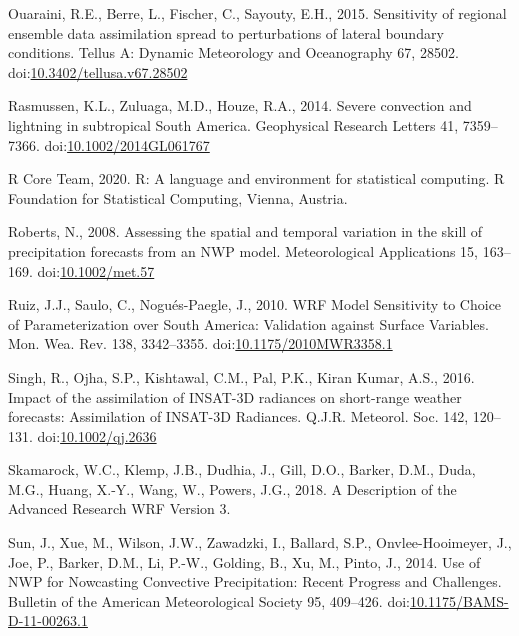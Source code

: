 \documentclass[final,5p,times,twocolumn,authoryear]{elsarticle} %
\begin{document}
\leavevmode\hypertarget{ref-ouaraini2015}{}%
Ouaraini, R.E., Berre, L., Fischer, C., Sayouty, E.H., 2015. Sensitivity of regional ensemble data assimilation spread to perturbations of lateral boundary conditions. Tellus A: Dynamic Meteorology and Oceanography 67, 28502. doi:\href{https://doi.org/10.3402/tellusa.v67.28502}{10.3402/tellusa.v67.28502}

\leavevmode\hypertarget{ref-rasmussen2014}{}%
Rasmussen, K.L., Zuluaga, M.D., Houze, R.A., 2014. Severe convection and lightning in subtropical South America. Geophysical Research Letters 41, 7359--7366. doi:\href{https://doi.org/10.1002/2014GL061767}{10.1002/2014GL061767}

\leavevmode\hypertarget{ref-rcoreteam2020}{}%
R Core Team, 2020. R: A language and environment for statistical computing. R Foundation for Statistical Computing, Vienna, Austria.

\leavevmode\hypertarget{ref-roberts2008}{}%
Roberts, N., 2008. Assessing the spatial and temporal variation in the skill of precipitation forecasts from an NWP model. Meteorological Applications 15, 163--169. doi:\href{https://doi.org/10.1002/met.57}{10.1002/met.57}

\leavevmode\hypertarget{ref-ruiz2010}{}%
Ruiz, J.J., Saulo, C., Nogués-Paegle, J., 2010. WRF Model Sensitivity to Choice of Parameterization over South America: Validation against Surface Variables. Mon. Wea. Rev. 138, 3342--3355. doi:\href{https://doi.org/10.1175/2010MWR3358.1}{10.1175/2010MWR3358.1}

\leavevmode\hypertarget{ref-singh2016}{}%
Singh, R., Ojha, S.P., Kishtawal, C.M., Pal, P.K., Kiran Kumar, A.S., 2016. Impact of the assimilation of INSAT-3D radiances on short-range weather forecasts: Assimilation of INSAT-3D Radiances. Q.J.R. Meteorol. Soc. 142, 120--131. doi:\href{https://doi.org/10.1002/qj.2636}{10.1002/qj.2636}

\leavevmode\hypertarget{ref-skamarock2018}{}%
Skamarock, W.C., Klemp, J.B., Dudhia, J., Gill, D.O., Barker, D.M., Duda, M.G., Huang, X.-Y., Wang, W., Powers, J.G., 2018. A Description of the Advanced Research WRF Version 3.

\leavevmode\hypertarget{ref-sun2014}{}%
Sun, J., Xue, M., Wilson, J.W., Zawadzki, I., Ballard, S.P., Onvlee-Hooimeyer, J., Joe, P., Barker, D.M., Li, P.-W., Golding, B., Xu, M., Pinto, J., 2014. Use of NWP for Nowcasting Convective Precipitation: Recent Progress and Challenges. Bulletin of the American Meteorological Society 95, 409--426. doi:\href{https://doi.org/10.1175/BAMS-D-11-00263.1}{10.1175/BAMS-D-11-00263.1}
\end{document}
